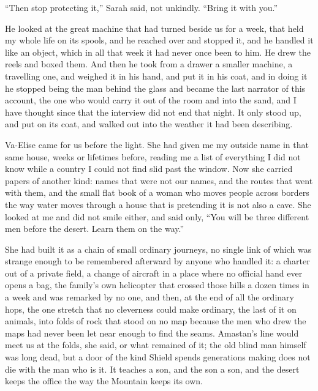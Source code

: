 ``Then stop protecting it,'' Sarah said, not unkindly. ``Bring it with you.''\par

He looked at the great machine that had turned beside us for a week, that held my whole life on its spools, and he reached over and stopped it, and he handled it like an object, which in all that week it had never once been to him. He drew the reels and boxed them. And then he took from a drawer a smaller machine, a travelling one, and weighed it in his hand, and put it in his coat, and in doing it he stopped being the man behind the glass and became the last narrator of this account, the one who would carry it out of the room and into the sand, and I have thought since that the interview did not end that night. It only stood up, and put on its coat, and walked out into the weather it had been describing.\par

Va-Elise came for us before the light. She had given me my outside name in that same house, weeks or lifetimes before, reading me a list of everything I did not know while a country I could not find slid past the window. Now she carried papers of another kind: names that were not our names, and the routes that went with them, and the small flat book of a woman who moves people across borders the way water moves through a house that is pretending it is not also a cave. She looked at me and did not smile either, and said only, ``You will be three different men before the desert. Learn them on the way.''\par

She had built it as a chain of small ordinary journeys, no single link of which was strange enough to be remembered afterward by anyone who handled it: a charter out of a private field, a change of aircraft in a place where no official hand ever opens a bag, the family's own helicopter that crossed those hills a dozen times in a week and was remarked by no one, and then, at the end of all the ordinary hops, the one stretch that no cleverness could make ordinary, the last of it on animals, into folds of rock that stood on no map because the men who drew the maps had never been let near enough to find the seams. Amastan's line would meet us at the folds, she said, or what remained of it; the old blind man himself was long dead, but a door of the kind Shield spends generations making does not die with the man who is it. It teaches a son, and the son a son, and the desert keeps the office the way the Mountain keeps its own.\par

